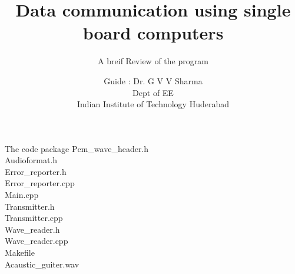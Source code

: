 \documentclass{beamer}
\begin{document}
\begin{frame}

\title[Module 1]{Data communication using single board computers}
\subtitle{}
\author[Prakruti Mallayya Bilagi] {A breif Review of the program}

\date{Guide : Dr. G V V Sharma\\Dept of EE\\Indian Institute of Technology Huderabad}
\maketitle
    
\end{frame}







\begin{frame}{The code package}
\bullet \qquad  Pcm\_wave\_header.h\\
\bullet \qquad  Audioformat.h \\
\bullet \qquad  Error\_reporter.h\\
\bullet \qquad  Error\_reporter.cpp\\ 
\bullet \qquad  Main.cpp \\
\bullet \qquad  Transmitter.h  \\
\bullet \qquad  Transmitter.cpp \\
\bullet \qquad  Wave\_reader.h\\
\bullet \qquad  Wave\_reader.cpp\\
\bullet \qquad  Makefile \\
\bullet \qquad  Acaustic\_guiter.wav \\



\end{frame}
\end{document}
